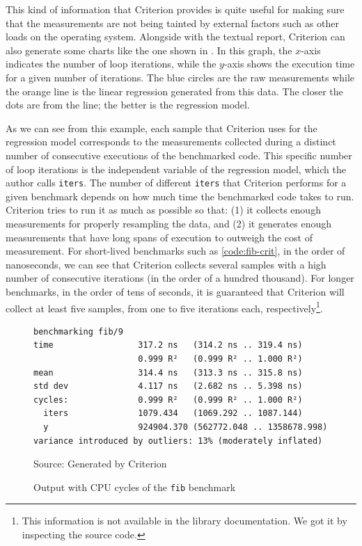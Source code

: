 This kind of information that Criterion provides is quite useful for making sure that the measurements are not being tainted by external factors such as other loads on the operating system. Alongside with the textual report, Criterion can also generate some charts like the one shown in . In this graph, the $x$-axis indicates the number of loop iterations, while the $y$-axis shows the execution time for a given number of iterations. The blue circles are the raw measurements while the orange line is the linear regression generated from this data. The closer the dots are from the line; the better is the regression model.

As we can see from this example, each sample that Criterion uses for the regression model corresponds to the measurements collected during a distinct number of consecutive executions of the benchmarked code. This specific number of loop iterations is the independent variable of the regression model, which the author calls \texttt{iters}. The number of different \texttt{iters} that Criterion performs for a given benchmark depends on how much time the benchmarked code takes to run. Criterion tries to run it as much as possible so that: (1) it collects enough measurements for properly resampling the data, and (2) it generates enough measurements that have long spans of execution to outweigh the cost of measurement. For short-lived benchmarks such as \autoref{code:fib-crit}, in the order of nanoseconds, we can see that Criterion collects several samples with a high number of consecutive iterations (in the order of a hundred thousand). For longer benchmarks, in the order of tens of seconds, it is guaranteed that Criterion will collect at least five samples, from one to five iterations each, respectively\footnote{This information is not available in the library documentation. We got it by inspecting the source code.}.

\begin{figure}[htp]
  \centering
  \caption{Output with CPU cycles of the \texttt{fib} benchmark}
  \begin{verbatim}
benchmarking fib/9
time                 317.2 ns   (314.2 ns .. 319.4 ns)
                     0.999 R²   (0.999 R² .. 1.000 R²)
mean                 314.4 ns   (313.3 ns .. 315.8 ns)
std dev              4.117 ns   (2.682 ns .. 5.398 ns)
cycles:              0.999 R²   (0.999 R² .. 1.000 R²)
  iters              1079.434   (1069.292 .. 1087.144)
  y                  924904.370 (562772.048 .. 1358678.998)
variance introduced by outliers: 13% (moderately inflated)
  \end{verbatim}
  \footnotesize{Source: Generated by Criterion}
  \label{fig:fib-cycle-output}
\end{figure}

